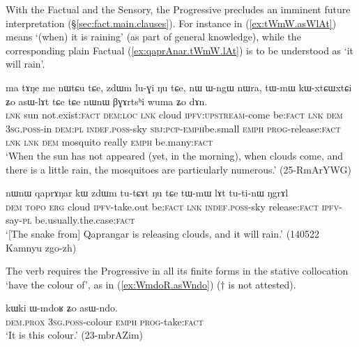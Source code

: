 With the Factual and the Sensory, the Progressive precludes an imminent future interpretation (§\ref{sec:fact.main.clauses}).  For instance  in (\ref{ex:tWmW.asWlAt}) means `(when) it is raining' (as part of general knowledge), while the corresponding plain Factual  (\ref{ex:qaprAnar.tWmW.lAt}) is to be understood as `it will rain'.

\largerpage
\begin{exe}
\ex \label{ex:tWmW.asWlAt}
\gll ma tɤŋe me nɯtɕu tɕe, zdɯm lu-ɣi ŋu tɕe, nɯ ɯ-ngɯ nɯra, tɯ-mɯ kɯ-xtɕɯ\redp{}xtɕi ʑo asɯ-lɤt tɕe tɕe nɯnɯ βɣɤrtsʰi wuma ʑo dɤn. \\
\textsc{lnk} sun not.exist:\textsc{fact} \textsc{dem}:\textsc{loc} \textsc{lnk} cloud \textsc{ipfv}:\textsc{upstream}-come be:\textsc{fact} \textsc{lnk} \textsc{dem} \textsc{3sg}.\textsc{poss}-in \textsc{dem}:\textsc{pl} \textsc{indef}.\textsc{poss}-sky \textsc{sbj}:\textsc{pcp}-\textsc{emph}\redp{}be.small \textsc{emph} \textsc{prog}-release:\textsc{fact} \textsc{lnk} \textsc{lnk} \textsc{dem} mosquito really \textsc{emph} be.many:\textsc{fact} \\
\glt  `When the sun has not appeared (yet, in the morning), when clouds come, and there is a little rain, the mosquitoes are particularly numerous.' (25-RmArYWG) 
\end{exe}
 
\begin{exe}
\ex \label{ex:qaprAnar.tWmW.lAt}
\gll nɯnɯ qaprɤŋar kɯ zdɯm tu-tɕɤt ŋu tɕe tɯ-mɯ lɤt tu-ti-nɯ ŋgrɤl \\
\textsc{dem}  \textsc{topo} \textsc{erg} cloud \textsc{ipfv}-take.out be:\textsc{fact} \textsc{lnk} \textsc{indef}.\textsc{poss}-sky release:\textsc{fact} \textsc{ipfv}-say-\textsc{pl} be.usually.the.case:\textsc{fact} \\
\glt `[The snake from] Qaprangar is releasing clouds, and it will rain.' (140522 Kamnyu zgo-zh) 
\end{exe}

The verb  requires the Progressive in all its finite forms in the stative collocation  `have the colour of', as in (\ref{ex:WmdoR.asWndo}) ($\dagger$ is not attested).

\begin{exe}
\ex \label{ex:WmdoR.asWndo}
\gll kɯki ɯ-mdoʁ ʑo asɯ-ndo. \\
\textsc{dem}.\textsc{prox} \textsc{3sg}.\textsc{poss}-colour \textsc{emph} \textsc{prog}-take:\textsc{fact} \\
\glt `It is this colour.' (23-mbrAZim) 
\end{exe}

